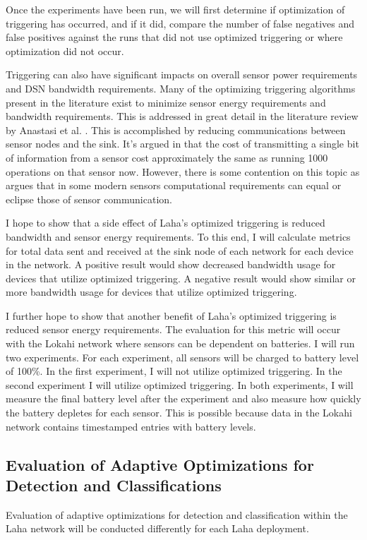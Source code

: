Once the experiments have been run, we will first determine if optimization of triggering has occurred, and if it did, compare the number of false negatives and false positives against the runs that did not use optimized triggering or where optimization did not occur. 

Triggering can also have significant impacts on overall sensor power requirements and DSN bandwidth requirements. Many of the optimizing triggering algorithms present in the literature exist to minimize sensor energy requirements and bandwidth requirements. This is addressed in great detail in the literature review by Anastasi et al. \cite{anastasi_energy_2009}. This is accomplished by reducing communications between sensor nodes and the sink. It's argued in \cite{pottie2000wireless} that the cost of transmitting a single bit of information from a sensor cost approximately the same as running 1000 operations on that sensor now. However, there is some contention on this topic as \cite{alippi_adaptive_2010} argues that in some modern sensors computational requirements can equal or eclipse those of  sensor communication.  

I hope to show that a side effect of Laha's optimized triggering is reduced bandwidth and sensor energy requirements. To this end, I will calculate metrics for total data sent and received at the sink node of each network for each device in the network. A positive result would show decreased bandwidth usage for devices that utilize optimized triggering. A negative result would show similar or more bandwidth usage for devices that utilize optimized triggering.

I further hope to show that another benefit of Laha's optimized triggering is reduced sensor energy requirements. The evaluation for this metric will occur with the Lokahi network where sensors can be dependent on batteries. I will run two experiments. For each experiment, all sensors will be charged to battery level of 100\%. In the first experiment, I will not utilize optimized triggering. In the second experiment I will utilize optimized triggering. In both experiments, I will measure the final battery level after the experiment and also measure how quickly the battery depletes for each sensor. This is possible because data in the Lokahi network contains timestamped entries with battery levels.

\subsection{Evaluation of Adaptive Optimizations for Detection and Classifications}
Evaluation of adaptive optimizations for detection and classification within the Laha network will be conducted differently for each Laha deployment.

